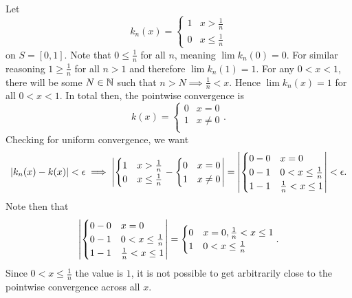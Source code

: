 \documentclass[../notes.tex]{subfiles}
\begin{document}
\begin{example}
    Let
    \[
        k_n(x) = \begin{cases}
            1 & x > \frac{1}{n} \\
            0 & x \leq \frac{1}{n}
        \end{cases}
    \]
    on $S = [0,1]$. Note that $0 \leq \frac{1}{n}$ for all $n$, meaning $\lim k_n(0) = 0$. For similar reasoning $1 \geq \frac{1}{n}$ for all $n > 1$ and therefore $\lim k_n(1) = 1$. For any $0 < x <1$, there will be some $N \in \mathbb{N}$ such that $n > N \implies \frac{1}{n} < x$. Hence $\lim k_n(x) = 1$ for all $0 < x < 1$. In total then, the pointwise convergence is
    \[
        k(x) = \begin{cases}
            0 & x = 0 \\
            1 & x \neq 0 \\
        \end{cases}
    .\]
    Checking for uniform convergence, we want
    \[
        |k_n(x) - k(x)| < \epsilon \implies \qty|
        \begin{cases}
            1 & x > \frac{1}{n} \\
            0 & x \leq \frac{1}{n}
        \end{cases} - 
        \begin{cases}
            0 & x = 0 \\
            1 & x \neq 0 \\
        \end{cases}
        | = \qty|
        \begin{cases}
            0 - 0 & x = 0 \\
            0 - 1 & 0 < x \leq \frac{1}{n} \\
            1 - 1 & \frac{1}{n} < x \leq 1
        \end{cases}
        | < \epsilon
    .\]
    Note then that
    \[
        \qty|
        \begin{cases}
            0 - 0 & x = 0 \\
            0 - 1 & 0 < x \leq \frac{1}{n} \\
            1 - 1 & \frac{1}{n} < x \leq 1
        \end{cases}
        | = 
        \begin{cases}
            0 & x = 0, \frac{1}{n} < x \leq 1  \\
            1 & 0 < x \leq \frac{1}{n}
        \end{cases}
    .\]
    Since $0 < x \leq \frac{1}{n}$ the value is $1$, it is not possible to get arbitrarily close to the pointwise convergence across all $x$.
\end{example}
\end{document}
